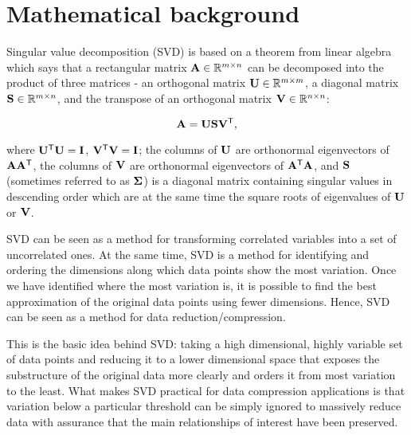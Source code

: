 \section{Mathematical background}
\label{sec:math}


Singular value decomposition (SVD) \cite{Baker2005, Kalman1996, Golub1996} is based on a theorem from linear algebra which says that a rectangular matrix $\mathbf{A} \in \mathbb{R}^{m \times n}$ can be decomposed into the product of three matrices - an orthogonal matrix $\mathbf{U} \in \mathbb{R}^{m \times m}$, a diagonal
matrix $\mathbf{S} \in \mathbb{R}^{m \times n}$, and the transpose of an orthogonal matrix $\mathbf{V} \in \mathbb{R}^{n \times n}$:

\begin{equation}
\mathbf{A} = \mathbf{U} \mathbf{S} \mathbf{V}^\mathsf{T},
\label{eq:svd-def}
\end{equation}

\noindent
where $\mathbf{U^\mathsf{T}U} = \mathbf{I}$, $\mathbf{V^\mathsf{T}V} = \mathbf{I}$; the columns of $\mathbf{U}$ are orthonormal eigenvectors of $\mathbf{AA^\mathsf{T}}$, the columns of $\mathbf{V}$ are orthonormal eigenvectors of $\mathbf{A^\mathsf{T}A}$, and $\mathbf{S}$ (sometimes referred to as $\mathbf{\Sigma}$) is a diagonal matrix containing singular values in descending order which are at the same time the square roots of eigenvalues of $\mathbf{U}$ or $\mathbf{V}$.

SVD can be seen as a method for transforming correlated variables into a set of uncorrelated ones. At the same time, SVD is a method for identifying and ordering the dimensions along which data points show the most variation. Once we have identified where the most variation is, it is possible to find the best approximation of the original data points using fewer dimensions. Hence, SVD can be seen as a method for data reduction/compression.

This is the basic idea behind SVD: taking a high dimensional, highly variable set of data points and reducing it to a lower dimensional space that exposes the substructure of the original data more clearly and orders it from most variation to the least. What makes SVD practical for data compression applications is that variation below a particular threshold can be simply ignored to massively reduce data with assurance that the main relationships of interest have been preserved.

